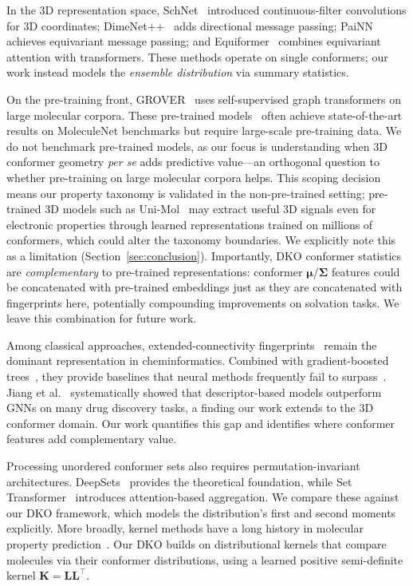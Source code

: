 \documentclass[sigconf]{acmart}
\newcommand{\rev}[1]{#1}
\begin{document}
\rev{In the 3D representation space,} SchNet~\cite{schutt2017schnet} introduced continuous-filter convolutions for 3D coordinates; DimeNet++~\cite{gasteiger2021dimenetpp} adds directional message passing; PaiNN~\cite{schutt2021painn} achieves equivariant message passing; and Equiformer~\cite{liao2023equiformer} combines equivariant attention with transformers.
These methods operate on single conformers; our work instead models the \emph{ensemble distribution} via summary statistics.

\rev{On the pre-training front,} GROVER~\cite{rong2020grover} uses self-supervised graph transformers on large molecular corpora. These pre-trained models~\cite{zhou2023unimol,rong2020grover} often achieve state-of-the-art results on MoleculeNet benchmarks but require large-scale pre-training data. We do not benchmark pre-trained models, as our focus is understanding when 3D conformer geometry \emph{per se} adds predictive value---an orthogonal question to whether pre-training on large molecular corpora helps. \rev{This scoping decision means our property taxonomy is validated in the non-pre-trained setting; pre-trained 3D models such as Uni-Mol~\cite{zhou2023unimol} may extract useful 3D signals even for electronic properties through learned representations trained on millions of conformers, which could alter the taxonomy boundaries. We explicitly note this as a limitation (Section~\ref{sec:conclusion}).} Importantly, DKO conformer statistics are \emph{complementary} to pre-trained representations: conformer $\boldsymbol{\mu}$/$\boldsymbol{\Sigma}$ features could be concatenated with pre-trained embeddings just as they are concatenated with fingerprints here, potentially compounding improvements on solvation tasks. We leave this combination for future work.

\rev{Among classical approaches,} extended-connectivity fingerprints~\cite{rogers2010ecfp} remain the dominant representation in cheminformatics.
Combined with gradient-boosted trees~\cite{chen2016xgboost}, they provide baselines that neural methods frequently fail to surpass~\cite{wu2018moleculenet,jiang2021gnn_vs_fp}. Jiang et al.~\cite{jiang2021gnn_vs_fp} systematically showed that descriptor-based models outperform GNNs on many drug discovery tasks, a finding our work extends to the 3D conformer domain.
Our work quantifies this gap and identifies where conformer features add complementary value.

\rev{Processing unordered conformer sets also requires} permutation-invariant architectures.
DeepSets~\cite{zaheer2017deepsets} provides the theoretical foundation, while Set Transformer~\cite{lee2019set} introduces attention-based aggregation.
We compare these against our DKO framework, which models the distribution's first and second moments explicitly.
\rev{More broadly,} kernel methods have a long history in molecular property prediction~\cite{rupp2012randomml}. Our DKO builds on distributional kernels that compare molecules via their conformer distributions, using a learned positive semi-definite kernel $\mathbf{K} = \mathbf{L}\mathbf{L}^\top$.
\end{document}
